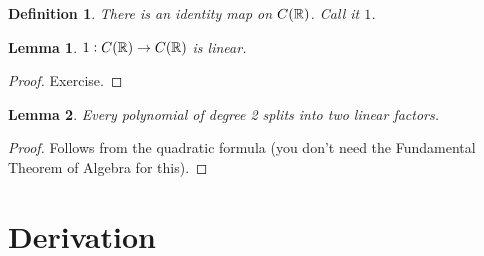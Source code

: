 \documentclass[oneside]{memoir}
\newtheorem{definition}{Definition}
\newtheorem{lemma}{Lemma}
\begin{document}
	\begin{definition}
		There is an identity map on \(C(\mathbb{R})\). Call it \(1\).
	\end{definition}
	\begin{lemma}
		\(1:C(\mathbb{R})\to C(\mathbb{R})\) is linear.
	\end{lemma}
	\begin{proof}
		Exercise.
	\end{proof}
	
	\begin{lemma}
		Every polynomial of degree 2 splits into two linear factors.
	\end{lemma}
	\begin{proof}
		Follows from the quadratic formula (you don't need the Fundamental Theorem of Algebra for this).
	\end{proof}
	
	\section{Derivation}
	
\end{document}
